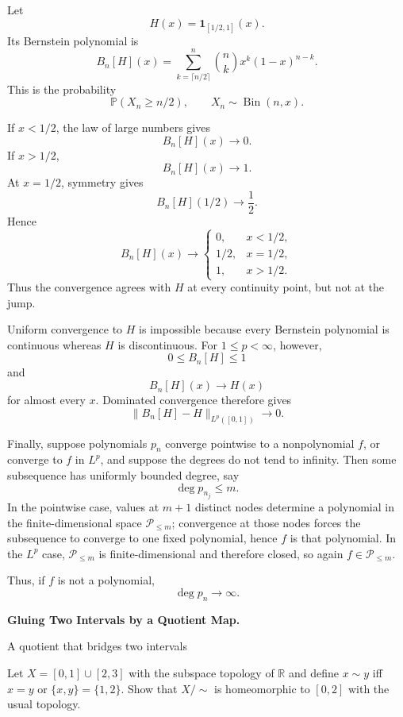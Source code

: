 \begin{solution}
Let
\[
H(x)=\mathbf1_{[1/2,1]}(x).
\]
Its Bernstein polynomial is
\[
B_n[H](x)
=
\sum_{k=\lceil n/2\rceil}^{n}
\binom nk x^k(1-x)^{n-k}.
\]
This is the probability
\[
\mathbb P(X_n\ge n/2),
\qquad
X_n\sim\operatorname{Bin}(n,x).
\]

If \(x<1/2\), the law of large numbers gives
\[
B_n[H](x)\to0.
\]
If \(x>1/2\),
\[
B_n[H](x)\to1.
\]
At \(x=1/2\), symmetry gives
\[
B_n[H](1/2)\to\frac12.
\]
Hence
\[
\boxed{
B_n[H](x)\to
\begin{cases}
0,&x<1/2,\\
1/2,&x=1/2,\\
1,&x>1/2.
\end{cases}
}
\]
Thus the convergence agrees with \(H\) at every continuity point, but not at the jump.

Uniform convergence to \(H\) is impossible because every Bernstein polynomial is continuous
whereas \(H\) is discontinuous. For \(1\le p<\infty\), however,
\[
0\le B_n[H]\le1
\]
and
\[
B_n[H](x)\to H(x)
\]
for almost every \(x\). Dominated convergence therefore gives
\[
\boxed{
\|B_n[H]-H\|_{L^p([0,1])}\to0.
}
\]

Finally, suppose polynomials \(p_n\) converge pointwise to a nonpolynomial \(f\), or converge
to \(f\) in \(L^p\), and suppose the degrees do not tend to infinity. Then some subsequence
has uniformly bounded degree, say
\[
\deg p_{n_j}\le m.
\]
In the pointwise case, values at \(m+1\) distinct nodes determine a polynomial in the
finite-dimensional space \(\mathcal P_{\le m}\); convergence at those nodes forces the
subsequence to converge to one fixed polynomial, hence \(f\) is that polynomial. In the
\(L^p\) case, \(\mathcal P_{\le m}\) is finite-dimensional and therefore closed, so again
\(f\in\mathcal P_{\le m}\).

Thus, if \(f\) is not a polynomial,
\[
\boxed{\deg p_n\to\infty.}
\]
\end{solution}


\begin{problem}[CP-II-0421]
\label{prob:cp-ii-0421}
\textbf{Gluing Two Intervals by a Quotient Map.}

\hspace*{1.5em}A quotient that bridges two intervals

Let $X=[0,1]\cup[2,3]$ with the subspace topology of $\mathbb{R}$ and define $x\sim y$ iff $x=y$ or $\{x,y\}=\{1,2\}$. Show that $X/\!\sim$ is homeomorphic to $[0,2]$ with the usual topology.
\end{problem}


